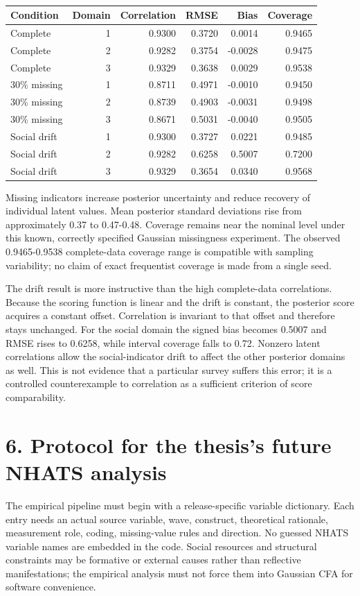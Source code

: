 \documentclass[11pt,a4paper]{article}
\begin{document}
\begin{table}[htbp]\centering\small
\caption{}
\begin{tabular}{lrrrrr}
\toprule
Condition & Domain & Correlation & RMSE & Bias & Coverage \\
\midrule
Complete & 1 & 0.9300 & 0.3720 & 0.0014 & 0.9465 \\
Complete & 2 & 0.9282 & 0.3754 & -0.0028 & 0.9475 \\
Complete & 3 & 0.9329 & 0.3638 & 0.0029 & 0.9538 \\
30\% missing & 1 & 0.8711 & 0.4971 & -0.0010 & 0.9450 \\
30\% missing & 2 & 0.8739 & 0.4903 & -0.0031 & 0.9498 \\
30\% missing & 3 & 0.8671 & 0.5031 & -0.0040 & 0.9505 \\
Social drift & 1 & 0.9300 & 0.3727 & 0.0221 & 0.9485 \\
Social drift & 2 & 0.9282 & 0.6258 & 0.5007 & 0.7200 \\
Social drift & 3 & 0.9329 & 0.3654 & 0.0340 & 0.9568 \\
\bottomrule
\end{tabular}
\end{table}

Missing indicators increase posterior uncertainty and reduce recovery of individual latent values. Mean posterior standard deviations rise from approximately 0.37 to 0.47-0.48. Coverage remains near the nominal level under this known, correctly specified Gaussian missingness experiment. The observed 0.9465-0.9538 complete-data coverage range is compatible with sampling variability; no claim of exact frequentist coverage is made from a single seed.

The drift result is more instructive than the high complete-data correlations. Because the scoring function is linear and the drift is constant, the posterior score acquires a constant offset. Correlation is invariant to that offset and therefore stays unchanged. For the social domain the signed bias becomes 0.5007 and RMSE rises to 0.6258, while interval coverage falls to 0.72. Nonzero latent correlations allow the social-indicator drift to affect the other posterior domains as well. This is not evidence that a particular survey suffers this error; it is a controlled counterexample to correlation as a sufficient criterion of score comparability.

\section*{6. Protocol for the thesis's future NHATS analysis}
The empirical pipeline must begin with a release-specific variable dictionary. Each entry needs an actual source variable, wave, construct, theoretical rationale, measurement role, coding, missing-value rules and direction. No guessed NHATS variable names are embedded in the code. Social resources and structural constraints may be formative or external causes rather than reflective manifestations; the empirical analysis must not force them into Gaussian CFA for software convenience.
\end{document}
